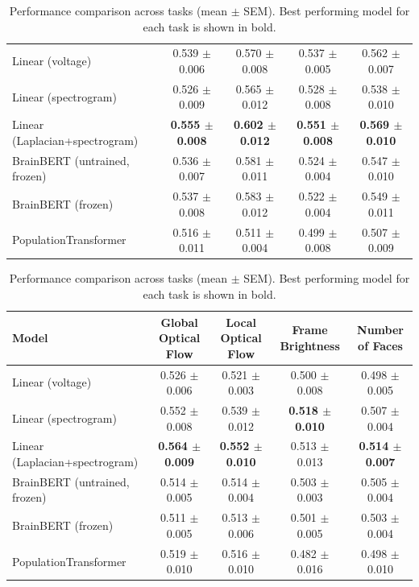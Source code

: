 \begin{table}[h]
\begin{tabular}{lcccc}
\hline
Linear (voltage) & 0.539 $\pm$ 0.006 & 0.570 $\pm$ 0.008 & 0.537 $\pm$ 0.005 & 0.562 $\pm$ 0.007 \\
Linear (spectrogram) & 0.526 $\pm$ 0.009 & 0.565 $\pm$ 0.012 & 0.528 $\pm$ 0.008 & 0.538 $\pm$ 0.010 \\
Linear (Laplacian+spectrogram) & \textbf{0.555 $\pm$ 0.008} & \textbf{0.602 $\pm$ 0.012} & \textbf{0.551 $\pm$ 0.008} & \textbf{0.569 $\pm$ 0.010} \\
BrainBERT (untrained, frozen) & 0.536 $\pm$ 0.007 & 0.581 $\pm$ 0.011 & 0.524 $\pm$ 0.004 & 0.547 $\pm$ 0.010 \\
BrainBERT (frozen) & 0.537 $\pm$ 0.008 & 0.583 $\pm$ 0.012 & 0.522 $\pm$ 0.004 & 0.549 $\pm$ 0.011 \\
PopulationTransformer & 0.516 $\pm$ 0.011 & 0.511 $\pm$ 0.004 & 0.499 $\pm$ 0.008 & 0.507 $\pm$ 0.009 \\
\hline
\end{tabular}
\hspace{1em}
\begin{tabular}{lcccc}
\hline
Model & Global Optical Flow & Local Optical Flow & Frame Brightness & Number of Faces \\
\hline
Linear (voltage) & 0.526 $\pm$ 0.006 & 0.521 $\pm$ 0.003 & 0.500 $\pm$ 0.008 & 0.498 $\pm$ 0.005 \\
Linear (spectrogram) & 0.552 $\pm$ 0.008 & 0.539 $\pm$ 0.012 & \textbf{0.518 $\pm$ 0.010} & 0.507 $\pm$ 0.004 \\
Linear (Laplacian+spectrogram) & \textbf{0.564 $\pm$ 0.009} & \textbf{0.552 $\pm$ 0.010} & 0.513 $\pm$ 0.013 & \textbf{0.514 $\pm$ 0.007} \\
BrainBERT (untrained, frozen) & 0.514 $\pm$ 0.005 & 0.514 $\pm$ 0.004 & 0.503 $\pm$ 0.003 & 0.505 $\pm$ 0.004 \\
BrainBERT (frozen) & 0.511 $\pm$ 0.005 & 0.513 $\pm$ 0.006 & 0.501 $\pm$ 0.005 & 0.503 $\pm$ 0.004 \\
PopulationTransformer & 0.519 $\pm$ 0.010 & 0.516 $\pm$ 0.010 & 0.482 $\pm$ 0.016 & 0.498 $\pm$ 0.010 \\
\hline
\end{tabular}
\caption{Performance comparison across tasks (mean $\pm$ SEM). Best performing model for each task is shown in bold.}
\label{tab:performance_comparison}
\end{table}